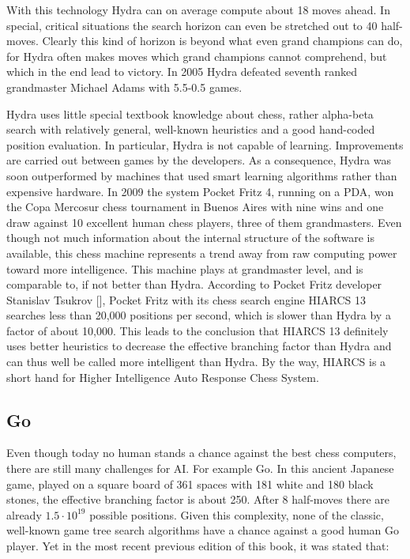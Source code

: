 \documentclass[10pt]{book}
\begin{document}
With this technology Hydra can on average compute about 18 moves ahead. In special, critical situations the search horizon can even be stretched out to 40 half-moves. Clearly this kind of horizon is beyond what even grand champions can do, for Hydra often makes moves which grand champions cannot comprehend, but which in the end lead to victory. In 2005 Hydra defeated seventh ranked grandmaster Michael Adams with 5.5-0.5 games.

Hydra uses little special textbook knowledge about chess, rather alpha-beta search with relatively general, well-known heuristics and a good hand-coded\\
position evaluation. In particular, Hydra is not capable of learning. Improvements are carried out between games by the developers. As a consequence, Hydra was soon outperformed by machines that used smart learning algorithms rather than expensive hardware.
In 2009 the system Pocket Fritz 4, running on a PDA, won the Copa Mercosur chess tournament in Buenos Aires with nine wins and one draw against 10 excellent human chess players, three of them grandmasters. Even though not much information about the internal structure of the software is available, this chess machine represents a trend away from raw computing power toward more intelligence. This machine plays at grandmaster level, and is comparable to, if not better than Hydra. According to Pocket Fritz developer Stanislav Tsukrov [\cite{wikipedia2013}], Pocket Fritz with its chess search engine HIARCS 13 searches less than 20,000 positions per second, which is slower than Hydra by a factor of about 10,000. This leads to the conclusion that HIARCS 13 definitely uses better heuristics to decrease the effective branching factor than Hydra and can thus well be called more intelligent than Hydra. By the way, HIARCS is a short hand for Higher Intelligence Auto Response Chess System.

\subsection{Go}
Even though today no human stands a chance against the best chess computers, there are still many challenges for AI. For example Go. In this ancient Japanese game, played on a square board of 361 spaces with 181 white and 180 black stones, the effective branching factor is about 250. After 8 half-moves there are already $1.5 \cdot 10^{19}$ possible positions. Given this complexity, none of the classic, well-known game tree search algorithms have a chance against a good human Go player. Yet in the most recent previous edition of this book, it was stated that:
\end{document}
